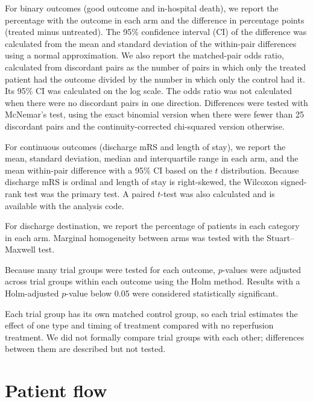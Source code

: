 For binary outcomes (good outcome and in-hospital death), we report the percentage with the outcome in each arm and the difference in percentage points (treated minus untreated). The 95\% confidence interval (CI) of the difference was calculated from the mean and standard deviation of the within-pair differences using a normal approximation. We also report the matched-pair odds ratio, calculated from discordant pairs as the number of pairs in which only the treated patient had the outcome divided by the number in which only the control had it. Its 95\% CI was calculated on the log scale. The odds ratio was not calculated when there were no discordant pairs in one direction. Differences were tested with McNemar's test\cite{mcnemar_note_1947}, using the exact binomial version when there were fewer than 25 discordant pairs and the continuity-corrected chi-squared version otherwise.

For continuous outcomes (discharge mRS and length of stay), we report the mean, standard deviation, median and interquartile range in each arm, and the mean within-pair difference with a 95\% CI based on the $t$ distribution. Because discharge mRS is ordinal and length of stay is right-skewed, the Wilcoxon signed-rank test\cite{wilcoxon_individual_1945} was the primary test. A paired $t$-test was also calculated and is available with the analysis code.

For discharge destination, we report the percentage of patients in each category in each arm. Marginal homogeneity between arms was tested with the Stuart--Maxwell test\cite{stuart_test_1955, maxwell_comparing_1970}.

Because many trial groups were tested for each outcome, $p$-values were adjusted across trial groups within each outcome using the Holm method\cite{holm_simple_1979}. Results with a Holm-adjusted $p$-value below 0.05 were considered statistically significant.

Each trial group has its own matched control group, so each trial estimates the effect of one type and timing of treatment compared with no reperfusion treatment. We did not formally compare trial groups with each other; differences between them are described but not tested.


\clearpage

\section{Patient flow}\label{sec:supp_flow}

